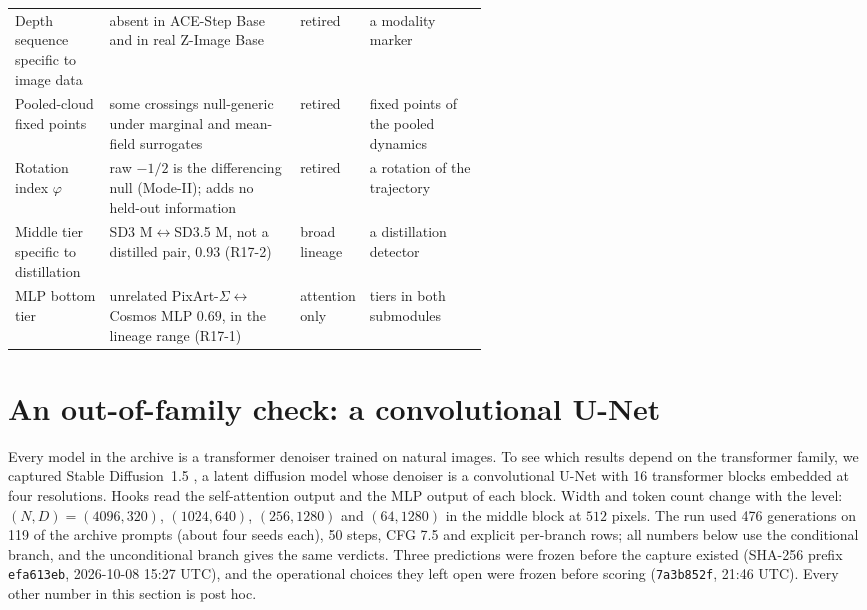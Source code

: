 \documentclass[11pt]{article}
\begin{document}
\begin{table}[htbp]
\begin{tabularx}{\linewidth}{@{}>{\raggedright\arraybackslash}p{0.2\linewidth}L>{\raggedright\arraybackslash}p{0.1\linewidth}>{\raggedright\arraybackslash}p{0.25\linewidth}@{}}
Depth sequence specific to image data & absent in ACE-Step Base and in real Z-Image Base & retired & a modality marker\\
Pooled-cloud fixed points & some crossings null-generic under marginal and mean-field surrogates & retired & fixed points of the pooled dynamics\\
Rotation index $\varphi$ & raw $-1/2$ is the differencing null (Mode-II); adds no held-out information & retired & a rotation of the trajectory\\
Middle tier specific to distillation & SD3 M$\leftrightarrow$SD3.5 M, not a distilled pair, $0.93$ (R17-2) & broad lineage & a distillation detector\\
MLP bottom tier & unrelated PixArt-$\Sigma$$\leftrightarrow$Cosmos MLP $0.69$, in the lineage range (R17-1) & attention only & tiers in both submodules\\
\bottomrule
\end{tabularx}
\end{table}


\section{An out-of-family check: a convolutional U-Net}\label{sec:unet}

Every model in the archive is a transformer denoiser trained on natural images. To see which results depend on the transformer family, we captured Stable Diffusion~1.5 \citep{rombach2022high}, a latent diffusion model whose denoiser is a convolutional U-Net \citep{ronneberger2015unet} with 16 transformer blocks embedded at four resolutions. Hooks read the self-attention output and the MLP output of each block. Width and token count change with the level: $(N,D)=(4096,320)$, $(1024,640)$, $(256,1280)$ and $(64,1280)$ in the middle block at $512$ pixels. The run used 476 generations on 119 of the archive prompts (about four seeds each), 50 steps, CFG 7.5 and explicit per-branch rows; all numbers below use the conditional branch, and the unconditional branch gives the same verdicts. Three predictions were frozen before the capture existed (SHA-256 prefix \texttt{efa613eb}, 2026-10-08 15:27 UTC), and the operational choices they left open were frozen before scoring (\texttt{7a3b852f}, 21:46 UTC). Every other number in this section is post hoc.
\end{document}
